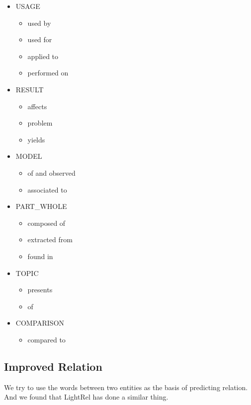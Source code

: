 \begin{itemize}
    \item USAGE
    \begin{itemize}
        \item used by
        \item used for
        \item applied to
        \item performed on
    \end{itemize}
    \item RESULT
    \begin{itemize}
        \item affects
        \item problem
        \item yields
    \end{itemize}
    \item MODEL
    \begin{itemize}
        \item of and observed
        \item associated to
    \end{itemize}
    \item PART\_WHOLE
    \begin{itemize}
        \item composed of
        \item extracted from
        \item found in
    \end{itemize}
    \item TOPIC
    \begin{itemize}
        \item presents
        \item of
    \end{itemize}
    \item COMPARISON
    \begin{itemize}
        \item compared to
    \end{itemize}
\end{itemize}

\subsection{Improved Relation}
\label{sec:improved_relation}

We try to use the words between two entities as the basis of predicting relation. And we found that LightRel has done a similar thing.

